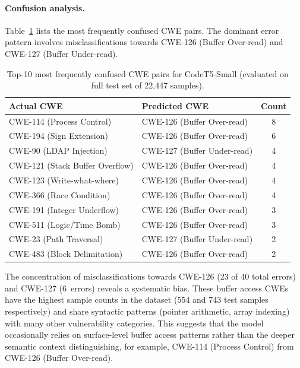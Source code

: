 \paragraph{Confusion analysis.}
Table~\ref{tab:confusion_pairs} lists the most frequently confused CWE
pairs.  The dominant error pattern involves misclassifications towards
CWE-126 (Buffer Over-read) and CWE-127 (Buffer Under-read).

\begin{table}[t]
\centering
\caption{Top-10 most frequently confused CWE pairs for CodeT5-Small
         (evaluated on full test set of 22,447 samples).}
\label{tab:confusion_pairs}
\begin{tabular}{llc}
\hline
\textbf{Actual CWE} & \textbf{Predicted CWE} & \textbf{Count} \\
\hline
CWE-114 (Process Control)         & CWE-126 (Buffer Over-read) & 8 \\
CWE-194 (Sign Extension)          & CWE-126 (Buffer Over-read) & 6 \\
CWE-90  (LDAP Injection)          & CWE-127 (Buffer Under-read)& 4 \\
CWE-121 (Stack Buffer Overflow)   & CWE-126 (Buffer Over-read) & 4 \\
CWE-123 (Write-what-where)        & CWE-126 (Buffer Over-read) & 4 \\
CWE-366 (Race Condition)          & CWE-126 (Buffer Over-read) & 4 \\
CWE-191 (Integer Underflow)       & CWE-126 (Buffer Over-read) & 3 \\
CWE-511 (Logic/Time Bomb)         & CWE-126 (Buffer Over-read) & 3 \\
CWE-23  (Path Traversal)          & CWE-127 (Buffer Under-read)& 2 \\
CWE-483 (Block Delimitation)      & CWE-126 (Buffer Over-read) & 2 \\
\hline
\end{tabular}
\end{table}

The concentration of misclassifications towards CWE-126 (23 of 40 total
errors) and CWE-127 (6~errors) reveals a systematic bias.  These buffer
access CWEs have the highest sample counts in the dataset (554 and 743 test
samples respectively) and share syntactic patterns (pointer arithmetic,
array indexing) with many other vulnerability categories.  This suggests
that the model occasionally relies on surface-level buffer access patterns
rather than the deeper semantic context distinguishing, for example,
CWE-114 (Process Control) from CWE-126 (Buffer Over-read).

